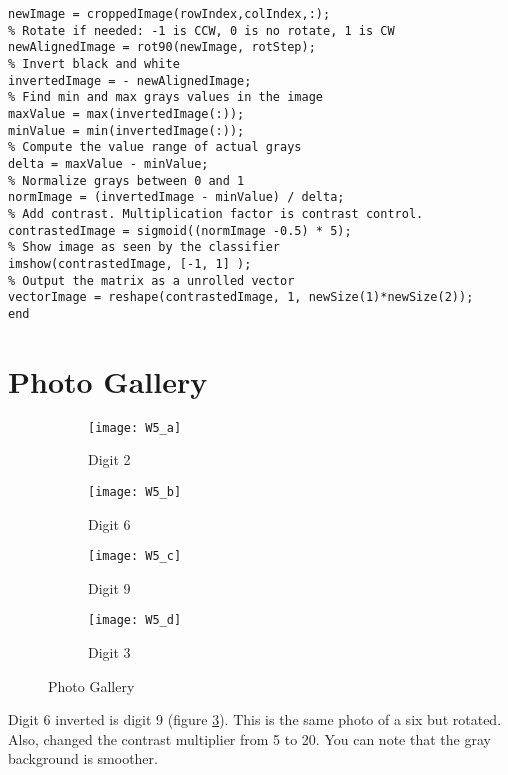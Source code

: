 \begin{Verbatim}[fontsize=\small]
% Copy just the indexed values from old image to get new image
newImage = croppedImage(rowIndex,colIndex,:);
% Rotate if needed: -1 is CCW, 0 is no rotate, 1 is CW
newAlignedImage = rot90(newImage, rotStep);
% Invert black and white
invertedImage = - newAlignedImage;
% Find min and max grays values in the image
maxValue = max(invertedImage(:));
minValue = min(invertedImage(:));
% Compute the value range of actual grays
delta = maxValue - minValue;
% Normalize grays between 0 and 1
normImage = (invertedImage - minValue) / delta;
% Add contrast. Multiplication factor is contrast control.
contrastedImage = sigmoid((normImage -0.5) * 5);
% Show image as seen by the classifier
imshow(contrastedImage, [-1, 1] );
% Output the matrix as a unrolled vector
vectorImage = reshape(contrastedImage, 1, newSize(1)*newSize(2));
end
\end{Verbatim}
\section{Photo Gallery}
\begin{figure}[h]
     \centering
     \begin{subfigure}[b]{0.47\textwidth}
         \centering
         \texttt{[image: W5\_a]}
         \caption{Digit 2}
         \label{fig:W5_a}
     \end{subfigure}
     \hfill
     \begin{subfigure}[b]{0.47\textwidth}
         \centering
         \texttt{[image: W5\_b]}
         \caption{Digit 6}
         \label{fig:W5_b}
     \end{subfigure}
     \hfill
     \begin{subfigure}[b]{0.47\textwidth}
         \centering
         \texttt{[image: W5\_c]}
         \caption{Digit 9}
         \label{fig:W5_c}
     \end{subfigure}
     \hfill
     \begin{subfigure}[b]{0.47\textwidth}
         \centering
         \texttt{[image: W5\_d]}
         \caption{Digit 3}
         \label{fig:W5_d}
     \end{subfigure}
        \caption{Photo Gallery}
        \label{fig:W5_gallery}
\end{figure}
Digit 6 inverted is digit 9 (figure \ref{fig:W5_c}). This is the same photo of a six but rotated. Also, changed the contrast multiplier from 5 to 20. You can note that the gray background is smoother.
